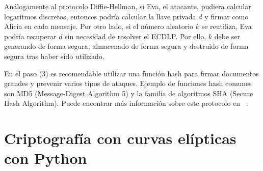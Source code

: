 Análogamente al protocolo Diffie-Hellman, si Eva, el atacante, pudiera calcular logaritmos discretos, entonces podría calcular la llave privada $d$ y firmar como Alicia en cada mensaje. Por otro lado, si el número aleatorio $k$ se reutiliza, Eva podría recuperar $d$ sin necesidad de resolver el ECDLP. Por ello, $k$ debe ser generando de forma segura, almacenado de forma segura y destruido de forma segura tras haber sido utilizado.

En el paso (3) es recomendable utilizar una función hash para firmar documentos grandes y prevenir varios tipos de ataques. Ejemplo de funciones hash comunes son MD5 (Message-Digest Algorithm 5) y la familia de algoritmos SHA (Secure Hash Algorithm). Puede encontrar más información sobre este protocolo en ~\cite{Hankerson:2003}.

\section{Criptografía con curvas elípticas con Python}
\label{sec:Criptografía con curvas elípticas con Python}

